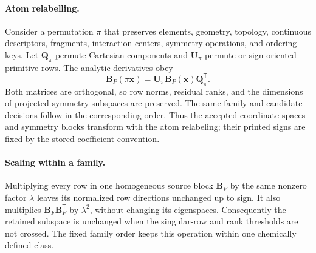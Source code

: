 \documentclass[10pt]{article}
\newcommand{\Bmat}{\mathbf{B}}
\begin{document}
\paragraph{Atom relabelling.}
{Consider a permutation \(\pi\) that preserves elements,
geometry, topology, continuous descriptors, fragments, interaction centers,
symmetry operations, and ordering keys. Let \(\mathbf Q_\pi\) permute
Cartesian components and \(\mathbf U_\pi\) permute or sign oriented primitive
rows. The analytic derivatives obey}
\begin{equation}
 {\Bmat_P(\pi\mathbf x)=
 \mathbf U_\pi\Bmat_P(\mathbf x)\mathbf Q_\pi^{\mathsf T}.}
 \label{eq:si-relabel-property}
\end{equation}
{Both matrices are orthogonal, so row norms, residual ranks,
and the dimensions of projected symmetry subspaces are preserved. The same
family and candidate decisions follow in the corresponding order. Thus the
accepted coordinate spaces and symmetry blocks transform with the atom
relabeling; their printed signs are fixed by the stored coefficient convention.}

\paragraph{Scaling within a family.}
{Multiplying every row in one homogeneous source block
\(\Bmat_F\) by the same nonzero factor \(\lambda\) leaves its normalized
row directions unchanged up to sign. It also multiplies
\(\Bmat_F\Bmat_F^{\mathsf T}\) by \(\lambda^2\), without changing its
eigenspaces. Consequently the retained subspace is unchanged when the
singular-row and rank thresholds are not crossed. The fixed family order
keeps this operation within one chemically defined class.}
\end{document}
